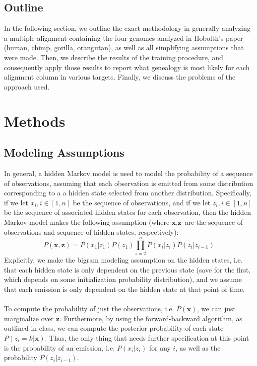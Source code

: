 \documentclass[12pt]{article}
\begin{document}
    \subsection{Outline}
    In the following section, we outline the exact methodology in generally analyzing a multiple alignment containing the four genomes analyzed in Hobolth's paper (human, chimp, gorilla, orangutan), as well as all simplifying assumptions that were made. Then, we describe the results of the training procedure, and consequently apply those results to report what genealogy is most likely for each alignment column in various targets. Finally, we discuss the problems of the approach used.
    \section{Methods}
    \subsection{Modeling Assumptions}
    In general, a hidden Markov model is used to model the probability of a sequence of observations, assuming that each observation is emitted from some distribution corresponding to a a hidden state selected from another distribution. Specifically, if we let $x_i, i \in [1,n]$ be the sequence of observations, and if we let $z_i, i \in [1,n]$ be the sequence of associated hidden states for each observation, then the hidden Markov model makes the following assumption (where $\textbf{x}, \textbf{z}$ are the sequence of observations and sequence of hidden states, respectively):
    $$P(\textbf{x}, \textbf{z}) = P(x_1 | z_1)P(z_1) \prod_{i=2}^{n} P(x_i | z_i) P(z_i | z_{i-1})$$
    Explicitly, we make the bigram modeling assumption on the hidden states, i.e. that each hidden state is only dependent on the previous state (save for the first, which depends on some initialization probability distribution), and we assume that each emission is only dependent on the hidden state at that point of time.
    \\ \\
    To compute the probability of just the observations, i.e. $P(\textbf{x})$, we can just marginalize over $\textbf{z}$. Furthermore, by using the forward-backward algorithm, as outlined in class, we can compute the posterior probability of each state $P(z_i = k | \textbf{x})$. Thus, the only thing that needs further specification at this point is the probability of an emission, i.e. $P(x_i | z_i)$ for any $i$, as well as the probability $P(z_i | z_{i-1})$.
\end{document}
